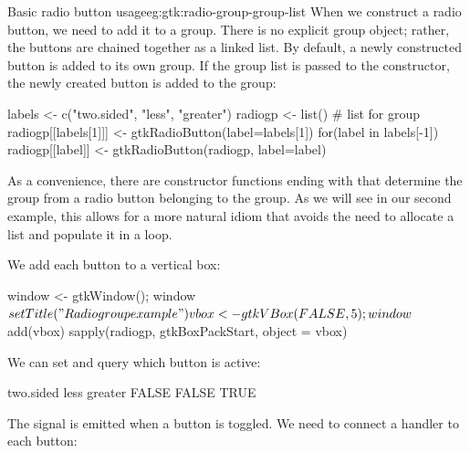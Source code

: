 \begin{example}{Basic radio button usage}{eg:gtk:radio-group-group-list} 
  When we construct a radio button, we need to add it to a
  group. There is no explicit group object; rather, the buttons are
  chained together as a linked list. By default, a newly constructed
  button is added to its own group. If the group list is passed to the
  constructor, the newly created button is added to the group:
\begin{Schunk}
\begin{Sinput}
 labels <- c("two.sided", "less", "greater")
 radiogp <- list()                           # list for group
 radiogp[[labels[1]]] <- gtkRadioButton(label=labels[1]) 
 for(label in labels[-1]) 
   radiogp[[label]] <- gtkRadioButton(radiogp, label=label)
\end{Sinput}
\end{Schunk}
%
As a convenience, there are constructor functions ending with
 that determine the group from a radio button
belonging to the group. As we will see in our second example, this
allows for a more natural  idiom that avoids the need
to allocate a list and populate it in a  loop.

We add each button to a vertical box:
\begin{Schunk}
\begin{Sinput}
 window <- gtkWindow(); window$setTitle("Radio group example")
 vbox <- gtkVBox(FALSE, 5); window$add(vbox)
 sapply(radiogp, gtkBoxPackStart, object = vbox)
\end{Sinput}
\end{Schunk}

We can set and query which button is active:
\begin{Schunk}
\begin{Sinput}
 vbox[[3]]$setActive(TRUE)           
 sapply(radiogp, `[`, "active") 
\end{Sinput}
\begin{Soutput}
two.sided      less   greater 
    FALSE     FALSE      TRUE 
\end{Soutput}
\end{Schunk}

The  signal is emitted when a button is toggled. We need
to connect a handler to each button:
\begin{Schunk}
\end{Schunk}
\end{example}

